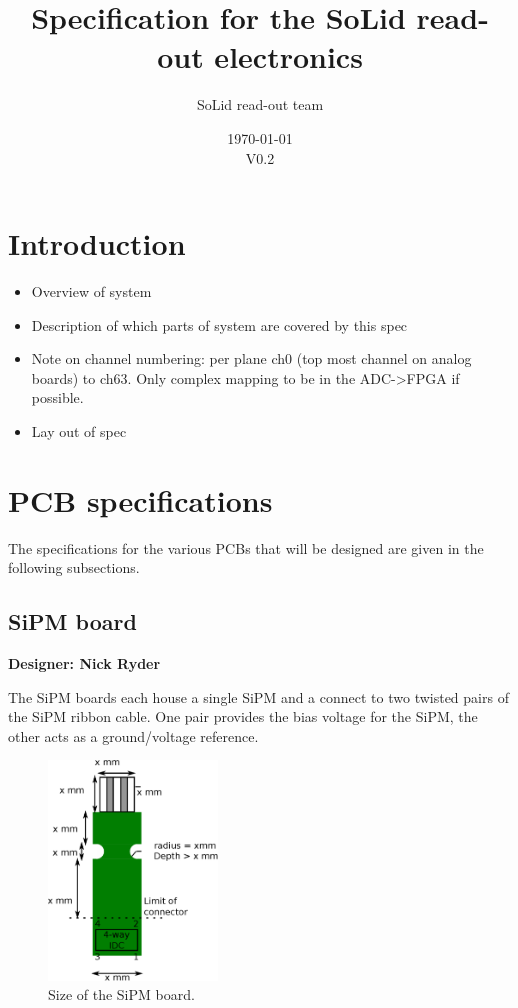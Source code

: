 \documentclass[a4paper]{article}
\title{Specification for the SoLid read-out electronics}
\author[]{SoLid read-out team}
\date{\today\\V0.2}
\begin{document}
\maketitle

\tableofcontents

\section{Introduction}

\begin{itemize}
    \item Overview of system
    \item Description of which parts of system are covered by this spec
    \item Note on channel numbering: per plane ch0 (top most channel on analog boards) to ch63. Only complex mapping to be in the ADC->FPGA if possible.
    \item Lay out of spec
\end{itemize}

\section{PCB specifications}

The specifications for the various PCBs that will be designed are given in the following subsections.

\clearpage
\newpage
\subsection{SiPM board}

{\bf Designer: Nick Ryder}

The SiPM boards each house a single SiPM and a connect to two twisted pairs of the SiPM ribbon cable.
One pair provides the bias voltage for the SiPM, the other acts as a ground/voltage reference.

\begin{figure}[h]
    \begin{center}
        \includegraphics[width=0.4\textwidth]{imgs/sipmboardsize}
        \caption{Size of the SiPM board.}
        \label{fig:sipmboardsize}
    \end{center}
\end{figure}
\end{document}
